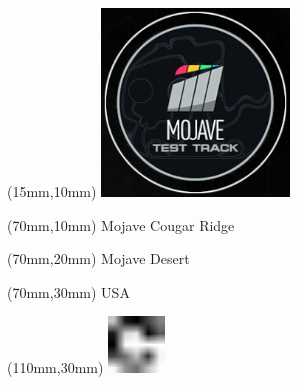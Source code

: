 \null\newpage
\begin{textblock*}{50mm}(15mm,10mm)%
\includegraphics[width=50mm]{LG/MOJA.png}
\end{textblock*}
\begin{textblock*}{130mm}(70mm,10mm)%
{\fontsize{20}{20}\selectfont Mojave Cougar Ridge}\\
\end{textblock*}
\begin{textblock*}{120mm}(70mm,20mm)%
{\fontsize{16}{16}\selectfont Mojave Desert}\\
\end{textblock*}
\begin{textblock*}{120mm}(70mm,30mm)%
{\fontsize{12}{12}\selectfont USA}
\end{textblock*}
\begin{textblock*}{30mm}(110mm,30mm)%
\centering
\includegraphics[height=15mm]{icons/fa-rotate-right.pdf}
\end{textblock*}

